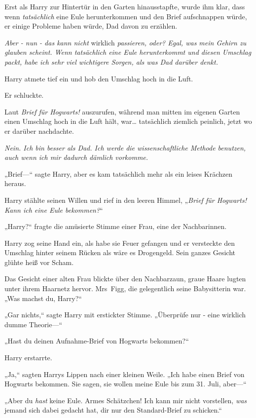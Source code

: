 {Erst als Harry zur Hintertür in den Garten hinausstapfte, wurde ihm klar, dass wenn \emph{tatsächlich} eine Eule herunterkommen und den Brief aufschnappen würde, er einige Probleme haben würde, Dad davon zu erzählen.

\emph{Aber - nun - das kann nicht} wirklich \emph{passieren, oder? Egal, was mein Gehirn zu glauben scheint. Wenn tatsächlich eine Eule herunterkommt und diesen Umschlag packt, habe ich sehr viel wichtigere Sorgen, als was Dad darüber denkt.}

Harry atmete tief ein und hob den Umschlag hoch in die Luft.

Er schluckte.

Laut \emph{Brief für Hogwarts!} auszurufen, während man mitten im eigenen Garten einen Umschlag hoch in die Luft hält, war… tatsächlich ziemlich peinlich, jetzt wo er darüber nachdachte.

\emph{Nein. Ich bin besser als Dad. Ich werde die wissenschaftliche Methode benutzen, auch wenn ich mir dadurch dämlich vorkomme.}

„Brief—“ sagte Harry, aber es kam tatsächlich mehr als ein leises Krächzen heraus.

Harry stählte seinen Willen und rief in den leeren Himmel, „\emph{Brief für Hogwarts! Kann ich eine Eule bekommen?}“

„Harry?“ fragte die amüsierte Stimme einer Frau, eine der Nachbarinnen.

Harry zog seine Hand ein, als habe sie Feuer gefangen und er versteckte den Umschlag hinter seinem Rücken als wäre es Drogengeld. Sein ganzes Gesicht glühte heiß vor Scham.

Das Gesicht einer alten Frau blickte über den Nachbarzaun, graue Haare lugten unter ihrem Haarnetz hervor. Mrs~Figg, die gelegentlich seine Babysitterin war. „Was machst du, Harry?“

„Gar nichts,“ sagte Harry mit erstickter Stimme. „Überprüfe nur - eine wirklich dumme Theorie—“

„Hast du deinen Aufnahme-Brief von Hogwarts bekommen?“

Harry erstarrte.

„Ja,“ sagten Harrys Lippen nach einer kleinen Weile. „Ich habe einen Brief von Hogwarts bekommen. Sie sagen, sie wollen meine Eule bis zum 31. Juli, aber—“

„Aber du \emph{hast} keine Eule. Armes Schätzchen! Ich kann mir nicht vorstellen, \emph{was} jemand sich dabei gedacht hat, dir nur den Standard-Brief zu schicken.“

}
